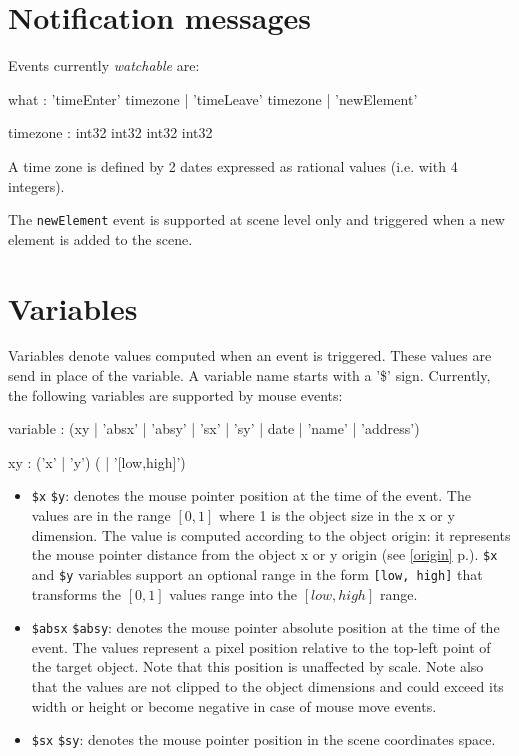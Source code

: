 \documentclass[a4paper,twoside]{report}
\newcommand{\sublevel}[1]	{\section{#1}}
\newcommand{\fullref}[1]	{\ref{#1} p.\pageref{#1}}
\newcommand{\OSC}[1]		{\texttt{#1}}
\begin{document}
\sublevel{Notification messages}
\label{notifymsg}

Events currently \emph{watchable} are:
\begin{rail}
what : 'timeEnter' timezone | 'timeLeave' timezone | 'newElement'
\end{rail}

\begin{rail}
timezone : int32 int32 int32 int32
\end{rail}
A time zone is defined by 2 dates expressed as rational values (i.e. with 4 integers).

The \OSC{newElement} event is supported at scene level only and triggered when a new element is added to the scene.


\sublevel{Variables}
\label{interactvar}

Variables denote values computed when an event is triggered. These values are send in place of the variable. A variable name starts with a '\$' sign. Currently, the following variables are supported by mouse events:
\begin{rail} 
variable : (xy | 'absx' | 'absy' | 'sx' | 'sy' | date | 'name' | 'address') 
\end{rail}

\begin{rail} 
xy : ('x' | 'y') ( | '[low,high]') 
\end{rail}

\begin{itemize}
\item \OSC{\$x} \OSC{\$y}: denotes the mouse pointer position at the time of the event. The values are in the range $[0,1]$ where 1 is the object size in the x or y dimension. The value is computed according to the object origin: it represents the mouse pointer distance from the object x or y origin (see \fullref{origin}). \OSC{\$x} and \OSC{\$y} variables support an optional range in the form \OSC{[low, high]} that transforms the $[0,1]$  values range into the $[low, high]$ range.

\item \OSC{\$absx} \OSC{\$absy}: denotes the mouse pointer absolute position at the time of the event. The values represent a pixel position relative to the top-left point of the target object. Note that this position is unaffected by scale. 
Note also that the values are not clipped to the object dimensions and could exceed its width or height or become negative in case of mouse move events.

\item \OSC{\$sx} \OSC{\$sy}: denotes the mouse pointer position in the scene coordinates space. 
\end{itemize}
\end{document}
